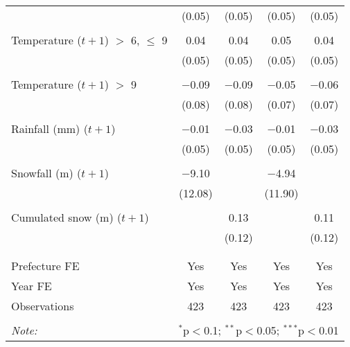 \begin{tabular}{@{\extracolsep{5pt}}lcccc}
  & (0.05) & (0.05) & (0.05) & (0.05) \\ 
  & & & & \\ 
 Temperature ($t + 1$) $>$ 6, $\le$ 9 & 0.04 & 0.04 & 0.05 & 0.04 \\ 
  & (0.05) & (0.05) & (0.05) & (0.05) \\ 
  & & & & \\ 
 Temperature ($t + 1$) $>$ 9 & $-$0.09 & $-$0.09 & $-$0.05 & $-$0.06 \\ 
  & (0.08) & (0.08) & (0.07) & (0.07) \\ 
  & & & & \\ 
 Rainfall (mm) ($t + 1$) & $-$0.01 & $-$0.03 & $-$0.01 & $-$0.03 \\ 
  & (0.05) & (0.05) & (0.05) & (0.05) \\ 
  & & & & \\ 
 Snowfall (m) ($t + 1$) & $-$9.10 &  & $-$4.94 &  \\ 
  & (12.08) &  & (11.90) &  \\ 
  & & & & \\ 
 Cumulated snow (m) ($t + 1$) &  & 0.13 &  & 0.11 \\ 
  &  & (0.12) &  & (0.12) \\ 
  & & & & \\ 
\hline \\[-1.8ex] 
Prefecture FE & Yes & Yes & Yes & Yes \\ 
Year FE & Yes & Yes & Yes & Yes \\ 
Observations & 423 & 423 & 423 & 423 \\ 
\hline 
\hline \\[-1.8ex] 
\textit{Note:}  & \multicolumn{4}{r}{$^{*}$p$<$0.1; $^{**}$p$<$0.05; $^{***}$p$<$0.01} \\ 
\end{tabular} 
